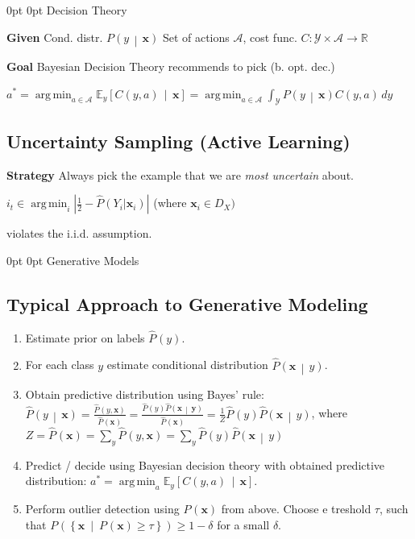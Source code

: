 \documentclass[a4paper,8pt,landscape]{extarticle}
\makeatletter
\newcommand{\R}{\mathbb{R}}
\newcommand{\cA}{\mathcal{A}}
\newcommand{\cY}{\mathcal{Y}}
\newcommand{\dset}[2]{\left\{ #1 \ \middle| \ #2 \right\}}
\newcommand{\abs}[1]{\left\lvert #1 \right\rvert}
\newcommand{\Prob}[2][]{P_{#1}\left( #2 \right)}
\newcommand{\cProb}[2]{P\left( #1 \,\middle|\, #2 \right)}
\newcommand{\hProb}[2][]{\hat{P}_{#1}\left( #2 \right)}
\newcommand{\chProb}[2]{\hat{P}\left( #1 \,\middle|\, #2 \right)}
\newcommand{\cExp}[3][]{{\mathbb{E}}_{#1}\left[ #2
\,\middle|\, #3 \right]}
\DeclareMathOperator*{\argmin}{arg\,min}
\renewcommand{\vec}[1]{\mathbf{#1}}
\newcommand{\vx}{\vec{x}}
\newcommand{\vy}{\vec{y}}
\newcommand*{\mybox}[1]{%
    \noindent\colorbox{sectionbarcolor}{%
        \parbox{\dimexpr\columnwidth-2\fboxsep\relax}{%
            \textcolor{white}{#1}}}}
\newcommand*{\mybox}[1]{%
    \noindent\colorbox{sectioncolor}{%
        \parbox{\dimexpr\columnwidth-2\fboxsep\relax}{%
            \textcolor{white}{#1}}}}
\renewcommand\section{\@startsection {section}{1}{\z@}%
                                   {0pt}%
                                   {0pt}%
                                   {\normalfont\bfseries\mybox}}
\makeatother
\begin{document}
\begin{multicols*}{3}
\section{Decision Theory}

\textbf{Given} Cond. distr. $\cProb{y}{\vx}$ Set of actions $\cA$, cost func.
$C\colon\cY\times\cA\to\R$

\textbf{Goal} Bayesian Decision Theory recommends to pick (b. opt. dec.)

$
a^*=\argmin_{a\in\cA} \cExp[y]{C(y,a)}{\vx}=\argmin_{a\in\cA} \int_\cY
 \cProb{y}{\vx}C(y,a) \, dy
$

\subsection{Uncertainty Sampling (Active Learning)}

\textbf{Strategy} Always pick the example that we are \emph{most uncertain}
about.

$i_t\in\argmin_i\abs{\frac{1}{2}-\hat{P}(Y_i|\vx_i)}$ (where $\vx_i\in
D_X)$
    
\Com violates the i.i.d. assumption.

\section{Generative Models}

\subsection{Typical Approach to Generative Modeling}

\begin{enumerate}[label=\arabic*)]
  \item Estimate prior on labels $\hProb{y}$.
  \item For each class $y$ estimate conditional distribution $\chProb{\vx}{y}$.
  \item Obtain predictive distribution using Bayes' rule:\\
  $\chProb{y}{\vx}=\frac{\hProb{y,\vx}}{\hProb{\vx}}
  =\frac{\hProb{y}\chProb{\vx}{\vy}}{\hProb{\vx}}
  =\frac{1}{Z}
  \hProb{y}\chProb{\vx}{y}$, where\\
  $Z=\hProb{\vx}=\sum_{y}\hProb{y,\vx}=\sum_{y}\hProb{y}\chProb{\vx}{y}$
  \item Predict / decide using Bayesian decision theory with obtained predictive 
  distribution: $a^* =\argmin_a \cExp[y]{C(y,a)}{\vx}$.
  \item Perform outlier detection using $\Prob{\vx}$ from above. Choose e
  treshold $\tau$, such that $\Prob{\dset{\vx}{\Prob{\vx}\geq \tau}}\geq
  1-\delta$ for a small $\delta$.
\end{enumerate}


\end{multicols*}
\end{document}
